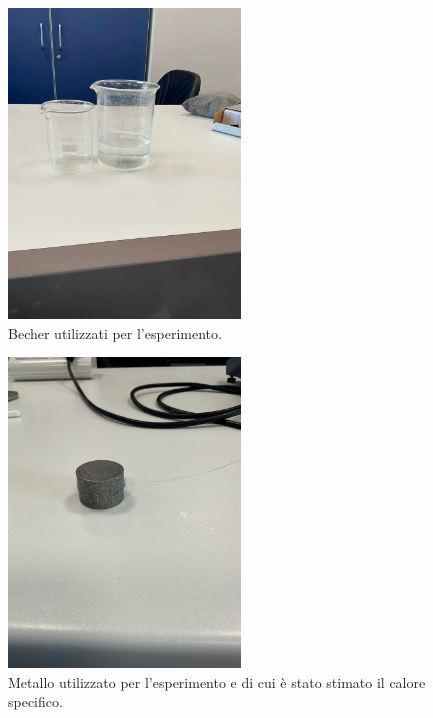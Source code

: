 \begin{figure}[H]
	\centering
	\includegraphics[width=0.55\textwidth]{./figures/becher}
	\caption{Becher utilizzati per l'esperimento.}
\end{figure}

\begin{figure}[H]
	\centering
	\includegraphics[width=0.55\textwidth]{./figures/materiale}
	\caption{Metallo utilizzato per l'esperimento e di cui è stato stimato il calore specifico.}
\end{figure}